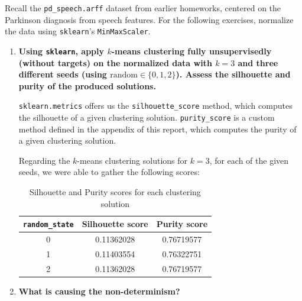 \documentclass[12pt]{article}
\begin{document}
Recall the \texttt{pd\_speech.arff} dataset from earlier homeworks, centered on
the Parkinson diagnosis from speech features. For the following exercises, normalize
the data using \texttt{sklearn}'s \texttt{MinMaxScaler}.

\begin{enumerate}[leftmargin=\labelsep]

  \item \textbf{Using \texttt{sklearn}, apply $k$-means clustering fully unsupervisedly
          (without targets) on the normalized data with $k = 3$ and three different seeds
          (using $\text{random} \in \{0, 1, 2\}$). Assess the silhouette and purity of the produced solutions.}

        \texttt{sklearn.metrics} offers us the \texttt{silhouette\_score} method, which
        computes the silhouette of a given clustering solution.
        \texttt{purity\_score} is a custom method defined in the appendix of this report,
        which computes the purity of a given clustering solution.

        Regarding the $k$-means clustering solutions for $k = 3$, for each of the
        given seeds, we were able to gather the following scores:

        \begin{table}[H]
          \centering
          \begin{tabular}{c|c|c}
            \textbf{\texttt{random\_state}} & \textbf{Silhouette score} & \textbf{Purity score} \\ \hline
            0                               & 0.11362028                & 0.76719577            \\
            1                               & 0.11403554                & 0.76322751            \\
            2                               & 0.11362028                & 0.76719577            \\
          \end{tabular}
          \caption{Silhouette and Purity scores for each clustering solution}
          \label{tab:clustering-solutions-scores}
        \end{table}


  \item \textbf{What is causing the non-determinism?}


\end{enumerate}
\end{document}
